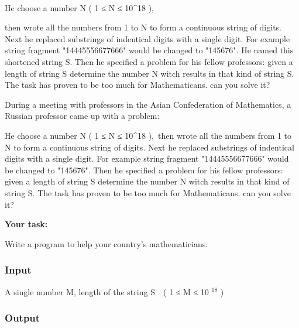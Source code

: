 




\\





    He choose a number N ( 1 ≤ N ≤ 10\textasciicircum18 ),   

    then wrote all the numbers from 1 to N to form a continuous string of digits. Next he replaced substrings of indentical digits with a single digit. For example string fragment "14445556677666" would be changed to "145676". He named this shortened string S. Then he specified a problem for his fellow professors: given a length of string S determine the number N witch results in that kind of string S. The task has proven to be too much for Mathematicans. can you solve it?   



    During a meeting with professors in the Asian Confederation of Mathematics, a Russian professor came up with a problem:   



    He choose a number N ( 1 ≤ N ≤ 10\textasciicircum18 ), then wrote all the numbers from 1 to N to form a continuous string of digits. Next he replaced substrings of indentical digits with a single digit. For example string fragment "14445556677666" would be changed to "145676". Then he specified a problem for his fellow professors: given a length of string S determine the number N witch results in that kind of string S. The task has proven to be too much for Mathematicans. can you solve it?   



\textbf{     Your task:    }



    Write a program to help your country's mathematicians.   



\subsubsection{    Input   }



     A single number M, length of the string S  ( 1 ≤ M ≤ 10     $^      18     $     )    



\subsubsection{    Output   }




